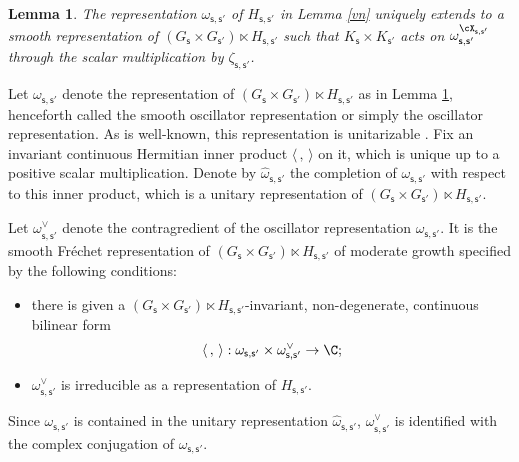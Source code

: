 \documentclass[12pt,a4paper]{amsart}
\newcommand{\la}{\langle}
\newcommand{\ra}{\rangle}
\numberwithin{equation}{section}
\newtheorem{lem}[thm]{Lemma}
\theoremstyle{remark}
\begin{document}
\begin{lem}\label{deforos}
The representation $\omega_{\mathsf s, \mathsf s'}$ of $H_{\mathsf s, \mathsf s'}$ in Lemma \ref{vn} uniquely extends to a  smooth representation of $(G_{\mathsf s}\times G_{\mathsf s'})\ltimes H_{\mathsf s, \mathsf s'}$ such  that $K_{\mathsf s}\times  K_{\mathsf s'}$ acts on  $ \omega_{\mathsf s, \mathsf s'}^{\cX_{\mathsf s, \mathsf s'}}$ through the scalar multiplication by $\zeta_{\mathsf s, \mathsf s'}$.
\end{lem}

Let $\omega_{\mathsf s, \mathsf s'}$ denote the representation of $(G_{\mathsf s}\times G_{\mathsf s'})\ltimes H_{\mathsf s, \mathsf s'}$ as in Lemma \ref{deforos}, henceforth called the smooth oscillator representation or simply the oscillator representation. As is well-known, this representation is unitarizable \cite{Weil}. Fix an invariant continuous Hermitian inner product $\la\,,\,\ra$ on it, which is unique up to a positive scalar multiplication.
Denote by $\hat \omega_{\mathsf s, \mathsf s'}$ the completion of $\omega_{\mathsf s, \mathsf s'}$ with respect to this inner product, which is a unitary representation of  $(G_{\mathsf s}\times G_{\mathsf s'})\ltimes H_{\mathsf s, \mathsf s'}$.

 Let $\omega_{\mathsf s, \mathsf s'}^\vee$ denote the  contragredient of the  oscillator  representation $\omega_{\mathsf s, \mathsf s'}$. It is  the smooth Fr\'echet representation of $(G_{\mathsf s}\times G_{\mathsf s'})\ltimes H_{\mathsf s, \mathsf s'}$ of moderate growth specified by the following conditions:
 \begin{itemize}
 \item there is given a  $(G_{\mathsf s}\times G_{\mathsf s'})\ltimes H_{\mathsf s, \mathsf s'}$-invariant, non-degenerate, continuous bilinear form
 \[
   \la\,,\,\ra:  \omega_{\mathsf s, \mathsf s'}\times \omega_{\mathsf s, \mathsf s'}^\vee\rightarrow \C;
 \]
 \item  $\omega_{\mathsf s, \mathsf s'}^\vee$  is irreducible as a representation of $H_{\mathsf s, \mathsf s'}$.
 \end{itemize}
Since $\omega_{\mathsf s, \mathsf s'}$ is contained in the unitary representation $\hat \omega_{\mathsf s, \mathsf s'}$, $\omega_{\mathsf s, \mathsf s'}^\vee$ is identified with the complex conjugation of $\omega_{\mathsf s, \mathsf s'}$.
\end{document}

